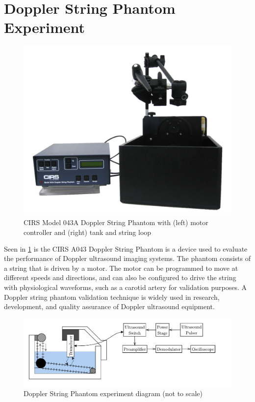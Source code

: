 \section{Doppler String Phantom Experiment}
\begin{figure}[htbp]
	\centering
	\includegraphics[width=.8\textwidth]{Figures/5_cirs_043a_image.jpg}
	\caption[CIRS Model 043A Doppler String Phantom]{CIRS Model 043A Doppler String Phantom with (left) motor controller and (right) tank and string loop}
	\label{fig:5_doppler_string_phantom}
\end{figure}
Seen in \cref{fig:5_doppler_string_phantom} is the CIRS A043 Doppler String Phantom is a device used to evaluate the performance of Doppler ultrasound imaging systems. The phantom consists of a string that is driven by a motor. The motor can be programmed to move at different speeds and directions, and can also be configured to drive the string with physiological waveforms, such as a carotid artery for validation purposes. A Doppler string phantom validation technique is widely used in research, development, and quality assurance of Doppler ultrasound equipment.
\begin{figure}[htbp]
	\centering
%		
	\includegraphics[width=\textwidth]{Figures/5_doppler_string_phantom_experiment.pdf}
	\caption{Doppler String Phantom experiment diagram (not to scale)}
	\label{fig:5_doppler_string_experiment}
\end{figure}
